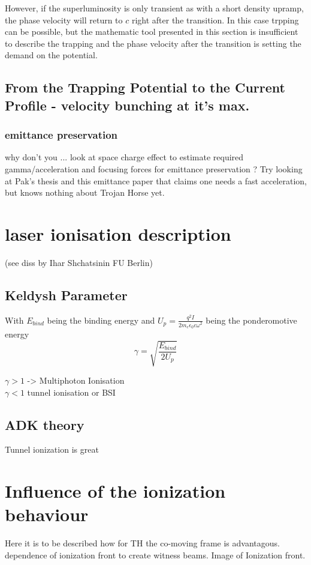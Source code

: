 However, if the superluminosity is only transient as with a short density upramp, the phase velocity will return to $c$ right after the transition. In this case trpping can be possible, but the mathematic tool presented in this section is insufficient to describe the trapping and the phase velocity after the transition is setting the demand on the potential.
\subsection{From the Trapping Potential to the Current Profile - velocity bunching at it's max.}
\subsubsection{emittance preservation}
why don't you ... look at space charge effect to estimate required gamma/acceleration and focusing forces for emittance preservation ? Try looking at Pak's thesis and this emittance paper that claims one needs a fast acceleration, but knows nothing about Trojan Horse yet.

\section{laser ionisation description}
(see diss by Ihar Shchatsinin FU Berlin)

\subsection{Keldysh Parameter}

With $E_{bind}$ being the binding energy and $U_p=\frac{q^2 I}{2 m_e \epsilon_0 c \omega^2}$ being the ponderomotive energy 
\begin{equation}
\gamma=\sqrt{\frac{E_{bind}}{2U_p}}
\end{equation}

$\gamma >1 $ -> Multiphoton Ionisation\\
$\gamma < 1$ tunnel ionisation or BSI

\subsection{ADK theory}
Tunnel ionization is great
	
	
\section{Influence of the ionization behaviour}
	Here it is to be described how for TH the co-moving frame is advantagous. dependence of ionization front to 
	create witness beams.
	Image of Ionization front.
	
